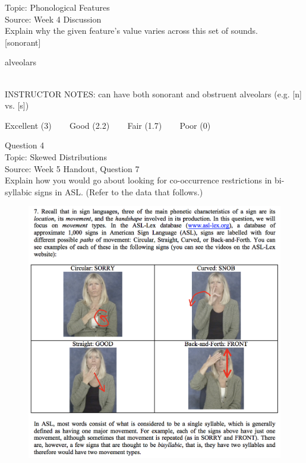 \documentclass[12pt]{article}
\begin{document}
Topic: Phonological Features\\
Source: Week 4 Discussion\\

Explain why the given feature's value varies across this set of sounds.\\

{[sonorant]}

alveolars


~\\
INSTRUCTOR NOTES: can have both sonorant and obstruent alveolars (e.g. [n] vs. [s])


\vfill
Excellent (3) ~~~ Good (2.2) ~~~ Fair (1.7) ~~~ Poor (0)
\newpage

{\large Question 4}\\

Topic: Skewed Distributions\\
Source: Week 5 Handout, Question 7\\

Explain how you would go about looking for co-occurrence restrictions in bi-syllabic signs in ASL. (Refer to the data that follows.)\\

\begin{figure}[H]
\includegraphics{../images/ASL_movement.png}
\end{figure}
\end{document}
